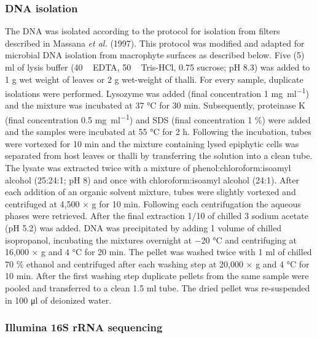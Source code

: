 \documentclass[12pt,]{article}
\begin{document}
\hypertarget{dna-isolation}{%
\subsubsection{DNA isolation}\label{dna-isolation}}

The DNA was isolated according to the protocol for isolation from
filters described in Massana \emph{et al.} (1997). This protocol was
modified and adapted for microbial DNA isolation from macrophyte
surfaces as described below. Five (5) \si{\ml} of lysis buffer (40
\si{\milli\Molar} EDTA, 50 \si{\milli\Molar} Tris-HCl, 0.75 \si{\Molar}
sucrose; pH 8.3) was added to 1 \si{\g} wet weight of leaves or 2
\si{\g} wet-weight of thalli. For every sample, duplicate isolations
were performed. Lysozyme was added (final concentration 1
\si{\mg\per\ml}) and the mixture was incubated at 37 \si{\degreeCelsius}
for 30 \si{\minute}. Subsequently, proteinase K (final concentration 0.5
\si{\mg\per\ml}) and SDS (final concentration 1 \si{\percent}) were
added and the samples were incubated at 55 \si{\degreeCelsius} for 2
\si{\hour}. Following the incubation, tubes were vortexed for 10
\si{\minute} and the mixture containing lysed epiphytic cells was
separated from host leaves or thalli by transferring the solution into a
clean tube. The lysate was extracted twice with a mixture of
phenol:chloroform:isoamyl alcohol (25:24:1; pH 8) and once with
chloroform:isoamyl alcohol (24:1). After each addition of an organic
solvent mixture, tubes were slightly vortexed and centrifuged at 4,500 ×
g for 10 \si{\minute}. Following each centrifugation the aqueous phases
were retrieved. After the final extraction 1/10 of chilled 3 \si{\Molar}
sodium acetate (pH 5.2) was added. DNA was precipitated by adding 1
volume of chilled isopropanol, incubating the mixtures overnight at
\num{-20} \si{\degreeCelsius} and centrifuging at 16,000 × g and 4
\si{\degreeCelsius} for 20 \si{\minute}. The pellet was washed twice
with 1 \si{\ml} of chilled 70 \si{\percent} ethanol and centrifuged
after each washing step at 20,000 × g and 4 \si{\degreeCelsius} for 10
\si{\minute}. After the first washing step duplicate pellets from the
same sample were pooled and transferred to a clean 1.5 \si{\ml} tube.
The dried pellet was re-suspended in 100 \si{\ul} of deionized water.

\hypertarget{illumina-16s-rrna-sequencing}{%
\subsubsection{Illumina 16S rRNA
sequencing}\label{illumina-16s-rrna-sequencing}}
\end{document}
